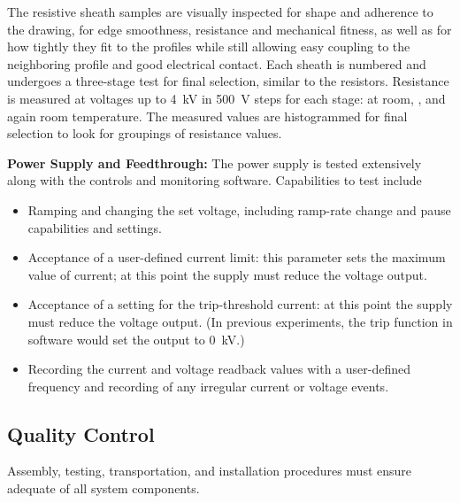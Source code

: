The resistive sheath samples are visually inspected for shape and adherence to the drawing, for edge smoothness, resistance and mechanical fitness, as well as for how tightly they fit to the profiles while still allowing %
easy coupling to the neighboring profile and good electrical contact.
Each sheath is numbered and undergoes %
a three-stage  test for final selection, %
similar to the resistors. Resistance is measured at voltages up to \SI{4}{kV} in \SI{500}{V} steps for each stage: at room, \lntwo{}, and again room temperature. %
The measured values are histogrammed for final selection to look for groupings of resistance values.   


{\bf Power Supply and Feedthrough:} The power supply is tested extensively along with the controls and monitoring software.  %
Capabilities to test include
\begin{itemize}
\item Ramping and changing the set voltage, including ramp-rate change and pause capabilities and settings. 
\item Acceptance of a user-defined current limit:  this parameter sets the %
maximum value of current; at this point the supply must reduce the voltage output.
\item Acceptance of a setting for the trip-threshold current:  %
at this point the supply must reduce the voltage output. 
(In previous experiments, the trip function in software would set the output to \SI{0}{kV}.) 
\item Recording the current and voltage readback values with a user-defined frequency and recording of any irregular current or voltage events. 
\end{itemize}


\subsection{Quality Control}
\label{sec:fddp-hv-transport-qc}

Assembly, testing, transportation, and installation procedures must ensure adequate  of all  system components.%

